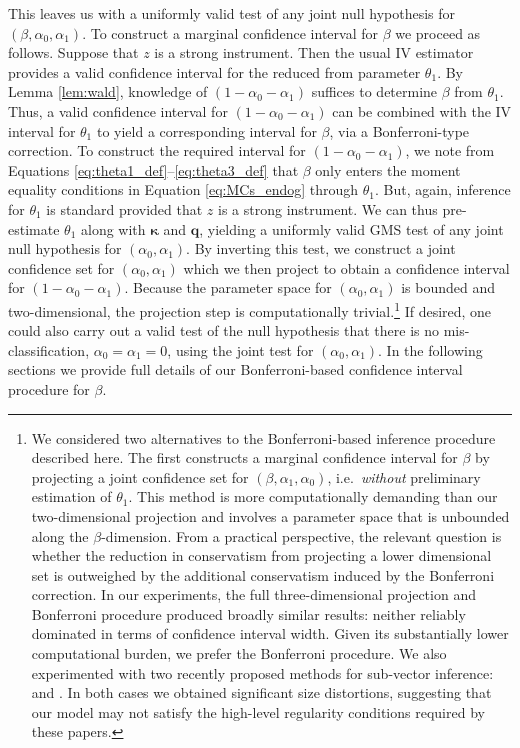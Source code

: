 This leaves us with a uniformly valid test of any joint null hypothesis for $(\beta, \alpha_0, \alpha_1)$.
To construct a marginal confidence interval for $\beta$ we proceed as follows.
Suppose that $z$ is a strong instrument.
Then the usual IV estimator provides a valid confidence interval for the reduced from parameter $\theta_1$.
By Lemma \ref{lem:wald}, knowledge of $(1 - \alpha_0 - \alpha_1)$ suffices to determine $\beta$ from $\theta_1$.
Thus, a valid confidence interval for $(1 - \alpha_0 - \alpha_1)$ can be combined with the IV interval for $\theta_1$ to yield a corresponding interval for $\beta$, via a Bonferroni-type correction.
To construct the required interval for $(1 - \alpha_0 - \alpha_1)$, we note from Equations \ref{eq:theta1_def}--\ref{eq:theta3_def}  that $\beta$ only enters the moment equality conditions in Equation \ref{eq:MCs_endog} through $\theta_1$.
But, again, inference for $\theta_1$ is standard provided that $z$ is a strong instrument.
We can thus pre-estimate $\theta_1$ along with $\boldsymbol{\kappa}$ and $\mathbf{q}$, yielding a uniformly valid GMS test of any joint null hypothesis for $(\alpha_0, \alpha_1)$.
By inverting this test, we construct a joint confidence set for $(\alpha_0, \alpha_1)$ which we then project to obtain a confidence interval for $(1 - \alpha_0 - \alpha_1)$. 
Because the parameter space for $(\alpha_0, \alpha_1)$ is bounded and two-dimensional, the projection step is computationally trivial.\footnote{We considered two alternatives to the Bonferroni-based inference procedure described here.
  The first constructs a marginal confidence interval for $\beta$ by projecting a joint confidence set for $(\beta, \alpha_1, \alpha_0)$, i.e.\ \emph{without} preliminary estimation of $\theta_1$.
This method is more computationally demanding than our two-dimensional projection and involves a parameter space that is unbounded along the $\beta$-dimension.
From a practical perspective, the relevant question is whether the reduction in conservatism from projecting a lower dimensional set is outweighed by the additional conservatism induced by the Bonferroni correction. 
In our experiments, the full three-dimensional projection and Bonferroni procedure produced broadly similar results: neither reliably dominated in terms of confidence interval width.
Given its substantially lower computational burden, we prefer the Bonferroni procedure.
We also experimented with two recently proposed methods for sub-vector inference: \cite{kaido2016confidence} and \cite{BugniCanayShi}. In both cases we obtained significant size distortions, suggesting that our model may not satisfy the high-level regularity conditions required by these papers.\label{foot:alternatives}}
If desired, one could also carry out a valid test of the null hypothesis that there is no mis-classification, $\alpha_0 = \alpha_1 = 0$, using the joint test for $(\alpha_0, \alpha_1)$. 
In the following sections we provide full details of our Bonferroni-based confidence interval procedure for $\beta$.



